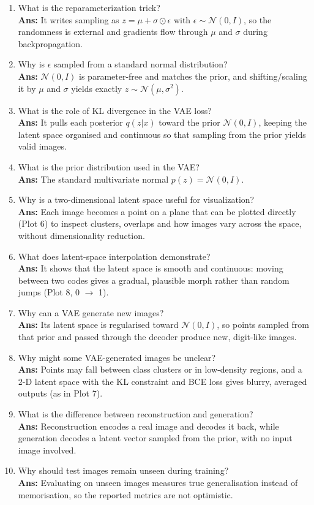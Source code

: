\documentclass[10pt]{article}
\begin{document}
\begin{enumerate}
\textbf{Ans:} Learning a distribution makes nearby latent points decode to similar images and lets us sample new points from the prior, which gives a continuous, generative latent space.
\item What is the reparameterization trick?\\
\textbf{Ans:} It writes sampling as $z=\mu+\sigma\odot\epsilon$ with $\epsilon\sim\mathcal{N}(0,I)$, so the randomness is external and gradients flow through $\mu$ and $\sigma$ during backpropagation.
\item Why is $\epsilon$ sampled from a standard normal distribution?\\
\textbf{Ans:} $\mathcal{N}(0,I)$ is parameter-free and matches the prior, and shifting/scaling it by $\mu$ and $\sigma$ yields exactly $z\sim\mathcal{N}(\mu,\sigma^2)$.
\item What is the role of KL divergence in the VAE loss?\\
\textbf{Ans:} It pulls each posterior $q(z|x)$ toward the prior $\mathcal{N}(0,I)$, keeping the latent space organised and continuous so that sampling from the prior yields valid images.
\item What is the prior distribution used in the VAE?\\
\textbf{Ans:} The standard multivariate normal $p(z)=\mathcal{N}(0,I)$.
\item Why is a two-dimensional latent space useful for visualization?\\
\textbf{Ans:} Each image becomes a point on a plane that can be plotted directly (Plot 6) to inspect clusters, overlaps and how images vary across the space, without dimensionality reduction.
\item What does latent-space interpolation demonstrate?\\
\textbf{Ans:} It shows that the latent space is smooth and continuous: moving between two codes gives a gradual, plausible morph rather than random jumps (Plot 8, 0 $\to$ 1).
\item Why can a VAE generate new images?\\
\textbf{Ans:} Its latent space is regularised toward $\mathcal{N}(0,I)$, so points sampled from that prior and passed through the decoder produce new, digit-like images.
\item Why might some VAE-generated images be unclear?\\
\textbf{Ans:} Points may fall between class clusters or in low-density regions, and a 2-D latent space with the KL constraint and BCE loss gives blurry, averaged outputs (as in Plot 7).
\item What is the difference between reconstruction and generation?\\
\textbf{Ans:} Reconstruction encodes a real image and decodes it back, while generation decodes a latent vector sampled from the prior, with no input image involved.
\item Why should test images remain unseen during training?\\
\textbf{Ans:} Evaluating on unseen images measures true generalisation instead of memorisation, so the reported metrics are not optimistic.
\end{enumerate}
\end{document}
